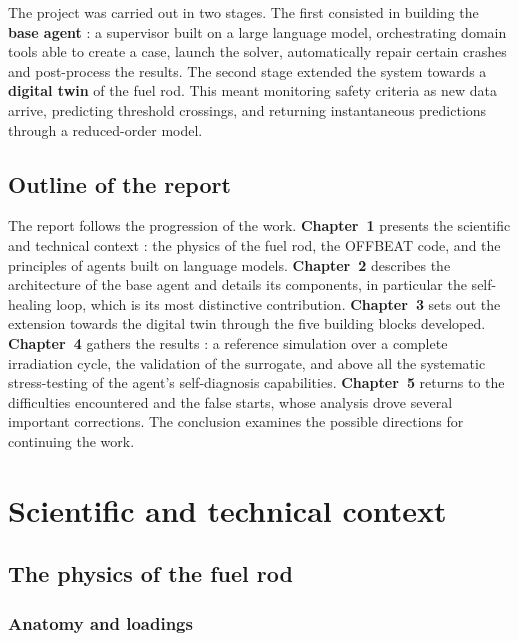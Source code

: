 The project was carried out in two stages. The first consisted in building the
\textbf{base agent} : a supervisor built on a large language model, orchestrating
domain tools able to create a case, launch the solver, automatically repair
certain crashes and post-process the results. The second stage extended the
system towards a \textbf{digital twin} of the fuel rod. This meant monitoring
safety criteria as new data arrive, predicting threshold crossings, and
returning instantaneous predictions through a reduced-order model.

\section*{Outline of the report}

The report follows the progression of the work. \textbf{Chapter~1} presents the
scientific and technical context : the physics of the fuel rod, the OFFBEAT code,
and the principles of agents built on language models. \textbf{Chapter~2}
describes the architecture of the base agent and details its components, in
particular the self-healing loop, which is its most distinctive contribution.
\textbf{Chapter~3} sets out the extension towards the digital twin through the
five building blocks developed. \textbf{Chapter~4} gathers the results : a
reference simulation over a complete irradiation cycle, the validation of the
surrogate, and above all the systematic stress-testing of the agent's
self-diagnosis capabilities. \textbf{Chapter~5} returns to the difficulties
encountered and the false starts, whose analysis drove several important
corrections. The conclusion examines the
possible directions for continuing the work.

\clearpage

\chapter{Scientific and technical context}

\section{The physics of the fuel rod}

\subsection{Anatomy and loadings}

